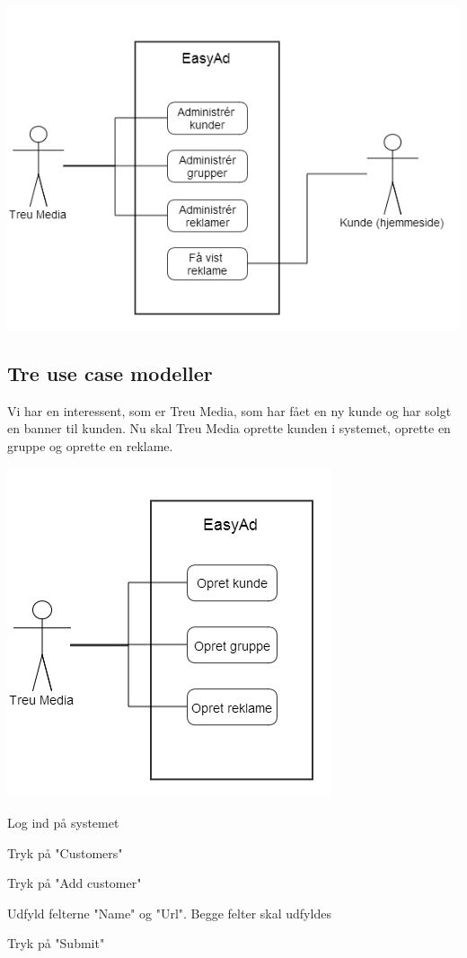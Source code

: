 \documentclass[a4paper,12pt]{article}
\begin{document}
\includegraphics[width=\linewidth]{use_case.png}

\subsection{Tre use case modeller}
Vi har en interessent, som er Treu Media, som har fået en ny kunde og har solgt en banner til kunden. Nu skal Treu Media oprette kunden i systemet, oprette en gruppe og oprette en reklame.

\includegraphics[scale=0.5]{three_use_cases.png}

\begin{usecase}
 {
	\item Log ind på systemet 
	\item Tryk på "Customers"
	\item Tryk på "Add customer"
	\item Udfyld felterne "Name" og "Url". Begge felter skal udfyldes
	\item Tryk på "Submit"
}
\end{usecase}
\end{document}
